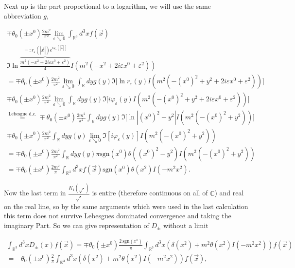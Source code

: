 \documentclass[a4paper,11pt]{article}
\begin{document}
Next up is the part proportional to a logarithm, we will use the same abbreviation \(g\),

\begin{align}
\mp \theta_0(\pm x^0) \frac{2m^2}{\pi^2} \lim_{\varepsilon \searrow 0} \int_{\mathbb{R}^3} d^3x f(\vec{x})~~~~~~~~~~~~~~~~~~~~~~~~~~~~~~~~~~~~~~~~~~~~~\\
 \Im \ln \overbrace{\frac{m^2(-x^2+2i\varepsilon x^0 + \varepsilon^2)}{4} }^{=: r_\varepsilon (|\vec{x}|)e^{i \varphi_\varepsilon (|\vec{x}|)}}I(m^2 (-x^2+2i\varepsilon x^0 + \varepsilon^2))\\
=\mp \theta_0(\pm x^0) \frac{2m^2}{\pi^2} \lim_{\varepsilon \searrow 0} \int_\mathbb{R} dy g(y) \Im \Big[\ln r_\varepsilon(y)
I(m^2 (-(x^0)^2 + y^2+2i\varepsilon x^0 + \varepsilon^2))\Big]\\
\mp \theta_0(\pm x^0) \frac{2m^2}{\pi^2} \lim_{\varepsilon \searrow 0} \int_\mathbb{R} dy g(y) \Im\Big[ i \varphi_\varepsilon(y)
 I(m^2 (-(x^0)^2 + y^2+2i\varepsilon x^0 + \varepsilon^2))\Big]\\
 \overset{\text{Lebesgue d.c.}}{=}\mp \theta_0(\pm x^0) \frac{2m^2}{\pi^2}  \int_\mathbb{R} dy g(y) \Im \Big[\ln |(x^0)^2-y^2|
I(m^2 (-(x^0)^2 + y^2))\Big]\\
\mp \theta_0(\pm x^0) \frac{2m^2}{\pi^2}  \int_\mathbb{R} dy g(y)\lim_{\varepsilon \searrow 0} \Im[ i \varphi_\varepsilon(y)]
 I(m^2 (-(x^0)^2 + y^2))\\
 =\mp \theta_0(\pm x^0) \frac{2m^2}{\pi^2}  \int_\mathbb{R} dy g(y) \pi \text{sgn}(x^0) \theta((x^0)^2-y^2)
 I(m^2 (-(x^0)^2 + y^2))\\
 = \mp \theta_0(\pm x^0) \frac{2 m^2}{\pi} \int_{\mathbb{R}^3} d^3 x f(\vec{x}) \text{sgn}(x^0) \theta(x^2) I(-m^2x^2).
\end{align}

Now the last term in \(\frac{K_1(\sqrt{\cdot})}{\sqrt{\cdot}}\) is entire (therefore continuous on all of \(\mathbb{C}\)) 
and real on the real line, so by the same arguments which were used
in the last calculation this term does not survive Lebesgues dominated convergence and taking the imaginary Part. 
So we can give representation of \(D_\pm\) without a limit

\begin{align}
\int_{\mathbb{R}^3}d^3 x D_\pm (x) f(\vec{x}) = \mp \theta_0(\pm x^0)\frac{2 ~\text{sgn}(x^0)}{\pi} \int_{\mathbb{R}^3}d^3 x ( \delta(x^2)+m^2 \theta(x^2) I(-m^2x^2))f(\vec{x})\\
=- \theta_0(\pm x^0)\frac{2 }{\pi} \int_{\mathbb{R}^3}d^3 x ( \delta(x^2)+m^2 \theta(x^2) I(-m^2x^2))f(\vec{x}),
\end{align}
\end{document}
